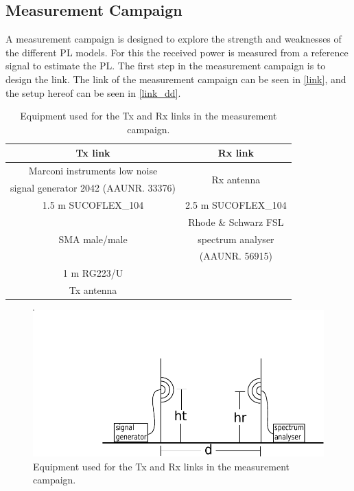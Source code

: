 
\subsection{Measurement Campaign}


A measurement campaign is designed to explore the strength and weaknesses of the different PL models. For this the received power is measured from a reference signal to estimate the PL. The first step in the measurement campaign is to design the link. The link of the measurement campaign can be seen in \autoref{link}, and the setup hereof can be seen in \autoref{link_dd}. 

\begin{table}[!htbp]
\centering
\caption{Equipment used for the Tx and Rx links in the measurement campaign.}
\begin{tabular}{|c|c|}\hline
\textbf{Tx link}&\textbf{Rx link}\\\hline
Marconi instruments low noise & \multirow{2}{*}{Rx antenna} \\
signal generator 2042 (AAUNR. 33376) & \\\hline
1.5 m SUCOFLEX\_104 & 2.5 m SUCOFLEX\_104 \\\hline 
\multirow{3}{*}{SMA male/male} & Rhode \& Schwarz FSL \\
&spectrum analyser \\
& (AAUNR. 56915)\\\hline
1 m RG223/U & \\\hline
Tx antenna &\\\hline
\end{tabular}
\label{link}
\end{table}
\newpage
\begin{figure}[!htbp]
\centering 
\includegraphics[scale=0.6]{figures/setup.pdf} 
\caption{Equipment used for the Tx and Rx links in the measurement campaign.}
\label{link_dd}
\end{figure}



